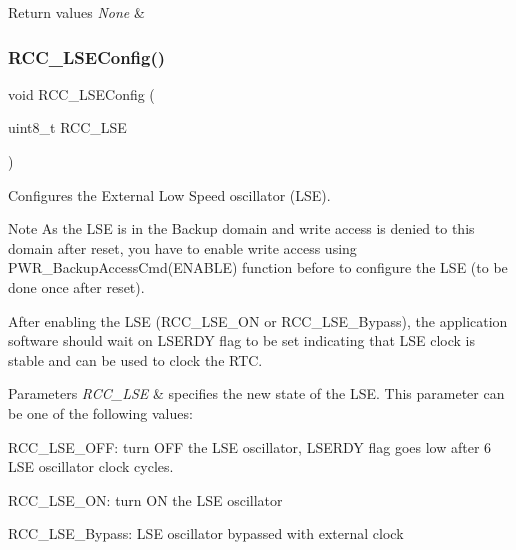 \begin{DoxyRetVals}{Return values}
{\em None} & \\
\hline
\end{DoxyRetVals}
\mbox{\label{group___r_c_c_ga65209ab5c3589b249c7d70f978735ca6}} 
\subsubsection{\texorpdfstring{R\+C\+C\+\_\+\+L\+S\+E\+Config()}{RCC\_LSEConfig()}}
{\footnotesize\ttfamily void R\+C\+C\+\_\+\+L\+S\+E\+Config (\begin{DoxyParamCaption}\item[{uint8\+\_\+t}]{R\+C\+C\+\_\+\+L\+SE }\end{DoxyParamCaption})}



Configures the External Low Speed oscillator (L\+SE). 

\begin{DoxyNote}{Note}
As the L\+SE is in the Backup domain and write access is denied to this domain after reset, you have to enable write access using P\+W\+R\+\_\+\+Backup\+Access\+Cmd(\+E\+N\+A\+B\+L\+E) function before to configure the L\+SE (to be done once after reset). ~\newline


After enabling the L\+SE (R\+C\+C\+\_\+\+L\+S\+E\+\_\+\+ON or R\+C\+C\+\_\+\+L\+S\+E\+\_\+\+Bypass), the application software should wait on L\+S\+E\+R\+DY flag to be set indicating that L\+SE clock is stable and can be used to clock the R\+TC. 
\end{DoxyNote}

\begin{DoxyParams}{Parameters}
{\em R\+C\+C\+\_\+\+L\+SE} & specifies the new state of the L\+SE. This parameter can be one of the following values\+: \begin{DoxyItemize}
\item R\+C\+C\+\_\+\+L\+S\+E\+\_\+\+O\+FF\+: turn O\+FF the L\+SE oscillator, L\+S\+E\+R\+DY flag goes low after 6 L\+SE oscillator clock cycles. \item R\+C\+C\+\_\+\+L\+S\+E\+\_\+\+ON\+: turn ON the L\+SE oscillator \item R\+C\+C\+\_\+\+L\+S\+E\+\_\+\+Bypass\+: L\+SE oscillator bypassed with external clock \end{DoxyItemize}
\\
\hline
\end{DoxyParams}

